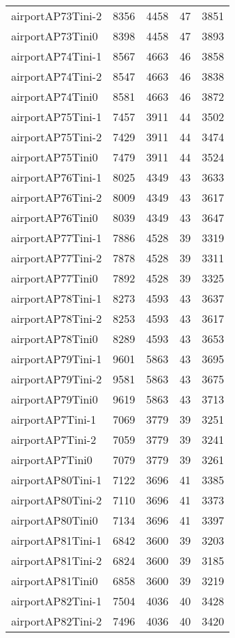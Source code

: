 \begin{longtable}{lrrrr}
airportAP73Tini-2 & 8356 & 4458 & 47 & 3851 \\
airportAP73Tini0 & 8398 & 4458 & 47 & 3893 \\
airportAP74Tini-1 & 8567 & 4663 & 46 & 3858 \\
airportAP74Tini-2 & 8547 & 4663 & 46 & 3838 \\
airportAP74Tini0 & 8581 & 4663 & 46 & 3872 \\
airportAP75Tini-1 & 7457 & 3911 & 44 & 3502 \\
airportAP75Tini-2 & 7429 & 3911 & 44 & 3474 \\
airportAP75Tini0 & 7479 & 3911 & 44 & 3524 \\
airportAP76Tini-1 & 8025 & 4349 & 43 & 3633 \\
airportAP76Tini-2 & 8009 & 4349 & 43 & 3617 \\
airportAP76Tini0 & 8039 & 4349 & 43 & 3647 \\
airportAP77Tini-1 & 7886 & 4528 & 39 & 3319 \\
airportAP77Tini-2 & 7878 & 4528 & 39 & 3311 \\
airportAP77Tini0 & 7892 & 4528 & 39 & 3325 \\
airportAP78Tini-1 & 8273 & 4593 & 43 & 3637 \\
airportAP78Tini-2 & 8253 & 4593 & 43 & 3617 \\
airportAP78Tini0 & 8289 & 4593 & 43 & 3653 \\
airportAP79Tini-1 & 9601 & 5863 & 43 & 3695 \\
airportAP79Tini-2 & 9581 & 5863 & 43 & 3675 \\
airportAP79Tini0 & 9619 & 5863 & 43 & 3713 \\
airportAP7Tini-1 & 7069 & 3779 & 39 & 3251 \\
airportAP7Tini-2 & 7059 & 3779 & 39 & 3241 \\
airportAP7Tini0 & 7079 & 3779 & 39 & 3261 \\
airportAP80Tini-1 & 7122 & 3696 & 41 & 3385 \\
airportAP80Tini-2 & 7110 & 3696 & 41 & 3373 \\
airportAP80Tini0 & 7134 & 3696 & 41 & 3397 \\
airportAP81Tini-1 & 6842 & 3600 & 39 & 3203 \\
airportAP81Tini-2 & 6824 & 3600 & 39 & 3185 \\
airportAP81Tini0 & 6858 & 3600 & 39 & 3219 \\
airportAP82Tini-1 & 7504 & 4036 & 40 & 3428 \\
airportAP82Tini-2 & 7496 & 4036 & 40 & 3420 \\

\end{longtable}
